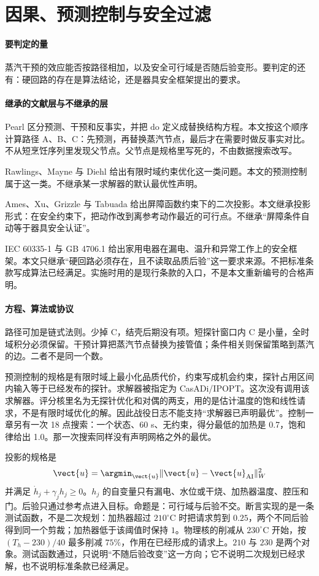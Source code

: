 \section{因果、预测控制与安全过滤}

\paragraph{要判定的量}
蒸汽干预的效应能否按路径相加，以及安全可行域是否随后验变形。要判定的还有：硬回路的存在是算法结论，还是器具安全框架提出的要求。

\paragraph{继承的文献层与不继承的层}
Pearl 区分预测、干预和反事实，并把 $\mathrm{do}$ 定义成替换结构方程\cite{pearl2009}。本文按这个顺序计算路径 A、B、C：先预测，再替换蒸汽节点，最后才在需要时做反事实对比。不从短烹饪序列里发现父节点。父节点是规格里写死的，不由数据搜索改写。

Rawlings、Mayne 与 Diehl 给出有限时域约束优化这一类问题\cite{rawlings2017}。本文的预测控制属于这一类。不继承某一求解器的默认最优性声明。

Ames、Xu、Grizzle 与 Tabuada 给出屏障函数约束下的二次投影\cite{ames2017cbf}。本文继承投影形式：在安全约束下，把动作改到离参考动作最近的可行点。不继承“屏障条件自动等于器具安全认证”。

IEC 60335-1 与 GB 4706.1 给出家用电器在漏电、温升和异常工作上的安全框架\cite{iec60335,gb4706}。本文只继承“硬回路必须存在，且不读取品质后验”这一要求来源。不把标准条款写成算法已经满足。实施时用的是现行条款的入口，不是本文重新编号的合格声明。

\paragraph{方程、算法或协议}
路径可加是链式法则。少掉 C，结壳后期没有项。短探针窗口内 C 是小量，全时域积分必须保留。干预计算把蒸汽节点替换为接管值；条件相关则保留策略到蒸汽的边。二者不是同一个数。

预测控制的规格是有限时域上最小化品质代价，约束写成机会约束，探针占用区间内输入等于已经发布的探针。求解器被指定为 CasADi/IPOPT。这次没有调用该求解器。评分核里名为无探针优化和对偶的两支，用的是估计温度的饱和线性请求，不是有限时域优化的解。因此战役日志不能支持“求解器已声明最优”。控制一章另有一次 18 点搜索：一个状态、60 s、无约束，得分最低的加热是 0.7，饱和律给出 1.0。那一次搜索同样没有声明网格之外的最优。

投影的规格是
\[
\vect{u}=\argmin_{\vect{u}}\|\vect{u}-\vect{u}_{\mathrm{AI}}\|_W^2
\]
并满足 $\dot h_j+\gamma_j h_j\ge 0$。$h_j$ 的自变量只有漏电、水位或干烧、加热器温度、腔压和门。后验只通过参考点进入目标。命题是：可行域与后验不交。断言实现的是一条测试函数，不是二次规划：加热器超过 $210^\circ\mathrm{C}$ 时把请求剪到 $0.25$，两个不同后验得到同一个剪裁；加热器低于该阈值时保持 $1$。物理核的削减从 $230^\circ\mathrm{C}$ 开始，按 $(T_h-230)/40$ 最多削减 $75\%$，作用在已经形成的请求上。$210$ 与 $230$ 是两个对象。测试函数通过，只说明“不随后验改变”这一方向；它不说明二次规划已经求解，也不说明标准条款已经满足。

